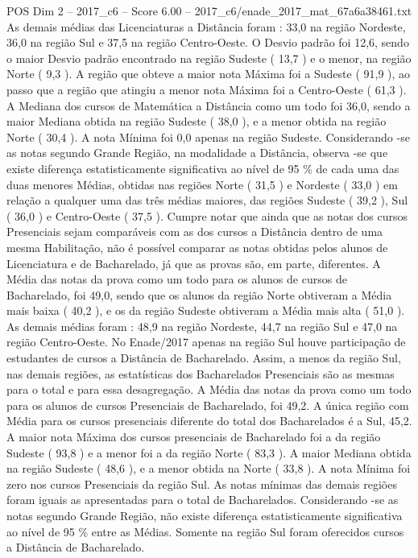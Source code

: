 \begin{textsample}{POS Dim 2 – 2017\_c6 – Score 6.00 – 2017\_c6/enade\_2017\_mat\_67a6a38461.txt}
As demais médias das Licenciaturas a Distância foram : 33,0 na região Nordeste, 36,0 na região Sul e 37,5 na região Centro-Oeste.
O Desvio padrão foi 12,6, sendo o maior Desvio padrão encontrado na região Sudeste ( 13,7 ) e o menor, na região Norte ( 9,3 ).
A região que obteve a maior nota Máxima foi a Sudeste ( 91,9 ), ao passo que a região que atingiu a menor nota Máxima foi a Centro-Oeste ( 61,3 ).
A Mediana dos cursos de Matemática a Distância como um todo foi 36,0, sendo a maior Mediana obtida na região Sudeste ( 38,0 ), e a menor obtida na região Norte ( 30,4 ).
A nota Mínima foi 0,0 apenas na região Sudeste.
Considerando -se as notas segundo Grande Região, na modalidade a Distância, observa -se que existe diferença estatisticamente significativa ao nível de 95 \% de cada uma das duas menores Médias, obtidas nas regiões Norte ( 31,5 ) e Nordeste ( 33,0 ) em relação a qualquer uma das três médias maiores, das regiões Sudeste ( 39,2 ), Sul ( 36,0 ) e Centro-Oeste ( 37,5 ).
Cumpre notar que ainda que as notas dos cursos Presenciais sejam comparáveis com as dos cursos a Distância dentro de uma mesma Habilitação, não é possível comparar as notas obtidas pelos alunos de Licenciatura e de Bacharelado, já que as provas são, em parte, diferentes.
A Média das notas da prova como um todo para os alunos de cursos de Bacharelado, foi 49,0, sendo que os alunos da região Norte obtiveram a Média mais baixa ( 40,2 ), e os da região Sudeste obtiveram a Média mais alta ( 51,0 ).
As demais médias foram : 48,9 na região Nordeste, 44,7 na região Sul e 47,0 na região Centro-Oeste.
No Enade/2017 apenas na região Sul houve participação de estudantes de cursos a Distância de Bacharelado.
Assim, a menos da região Sul, nas demais regiões, as estatísticas dos Bacharelados Presenciais são as mesmas para o total e para essa desagregação.
A Média das notas da prova como um todo para os alunos de cursos Presenciais de Bacharelado, foi 49,2.
A única região com Média para os cursos presenciais diferente do total dos Bacharelados é a Sul, 45,2.
A maior nota Máxima dos cursos presenciais de Bacharelado foi a da região Sudeste ( 93,8 ) e a menor foi a da região Norte ( 83,3 ).
A maior Mediana obtida na região Sudeste ( 48,6 ), e a menor obtida na Norte ( 33,8 ).
A nota Mínima foi zero nos cursos Presenciais da região Sul.
As notas mínimas das demais regiões foram iguais as apresentadas para o total de Bacharelados.
Considerando -se as notas segundo Grande Região, não existe diferença estatisticamente significativa ao nível de 95 \% entre as Médias.
Somente na região Sul foram oferecidos cursos a Distância de Bacharelado.

\end{textsample}
